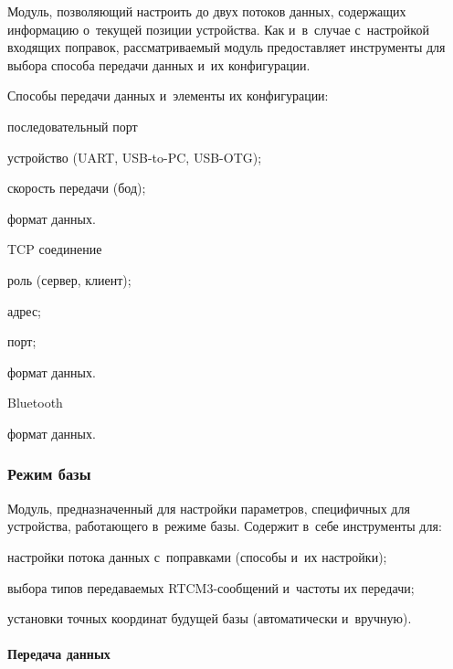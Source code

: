 Модуль, позволяющий настроить до двух потоков данных, содержащих информацию о~текущей позиции устройства. Как и~в~случае с~настройкой входящих поправок, рассматриваемый модуль предоставляет инструменты для выбора способа передачи данных и~их конфигурации.

Способы передачи данных и~элементы их конфигурации:
\begin{dashitemize}
  \item последовательный порт
  \begin{dashitemize}
    \item устройство (UART, USB-to-PC, USB-OTG);
    \item скорость передачи (бод);
    \item формат данных.
  \end{dashitemize}

  \item TCP соединение
  \begin{dashitemize}
    \item роль (сервер, клиент);
    \item адрес;
    \item порт;
    \item формат данных.
  \end{dashitemize}

  \item Bluetooth
  \begin{dashitemize}
    \item формат данных.
  \end{dashitemize}
\end{dashitemize}


\subsubsection{Режим базы}

Модуль, предназначенный для настройки параметров, специфичных для устройства, работающего в~режиме базы. Содержит в~себе инструменты для:
\begin{dashitemize}
  \item настройки потока данных с~поправками (способы и~их настройки);
  \item выбора типов передаваемых RTCM3-сообщений и~частоты их передачи;
  \item установки точных координат будущей базы (автоматически и~вручную).
\end{dashitemize}

\paragraph{Передача данных}

